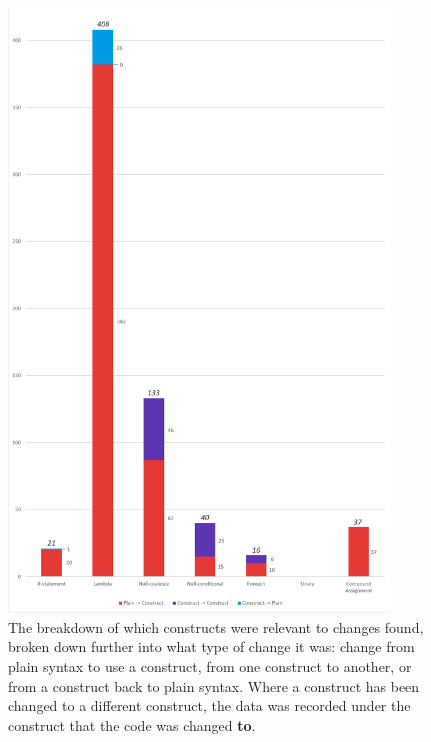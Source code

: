 \documentclass{article}
\begin{document}
        \begin{figure}[htbp]
            \centering
            \includegraphics[width=0.9\textwidth]{commitBreakdown}
            \caption{The breakdown of which constructs were relevant to changes found, broken down further into what type of change it was: change from plain syntax to use a construct, from one construct to another, or from a construct back to plain syntax. Where a construct has been changed to a different construct, the data was recorded under the construct that the code was changed \textbf{to}.}
            \label{fig:commitBreakdown}
        \end{figure}
\end{document}
